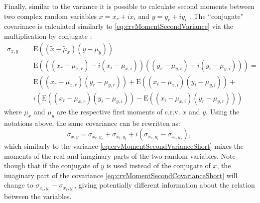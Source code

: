 \documentclass[
]{book}
\begin{document}
Finally, similar to the variance it is possible to calculate second moments between two complex random variables \(x = x_r+i x_i\) and \(y = y_r + i y_i\) \citep{Picinbono1997}. The ``conjugate'' covariance is calculated similarly to \eqref{eq:crvMomentSecondVariance} via the multiplication by conjugate \citep{Neeser1993}:
\begin{equation}
    \begin{aligned}
    \sigma_{x,y} = & \mathrm{E}((\tilde{x}-\tilde{\mu}_x) (y-\mu_y)) = \\
                   & \mathrm{E}\left(((x_r-\mu_{x,r}) - i (x_i-\mu_{x,i}))((y_r-\mu_{y,r}) + i (y_i-\mu_{y,i}))\right) = \\
                   & \mathrm{E}((x_r-\mu_{x,r})(y_r-\mu_{y,r})) + \mathrm{E}((x_i-\mu_{x,i})(y_i-\mu_{y,i})) + \\
                   & i \left(\mathrm{E}((x_r-\mu_{x,r})(y_i-\mu_{y,i})) - \mathrm{E}((x_i-\mu_{x,i})(y_r-\mu_{y,r}))\right)
    \end{aligned}
    \label{eq:crvMomentSecondCovariance}
\end{equation}
where \(\mu_{x}\) and \(\mu_y\) are the respective first moments of c.r.v. \(x\) and \(y\). Using the notations above, the same covariance can be rewritten as:
\begin{equation}
    \sigma_{x,y} = \sigma_{x_r, y_r} + \sigma_{x_i, y_i} + i (\sigma_{x_r, y_i} - \sigma_{x_i, y_r}),
    \label{eq:crvMomentSecondCovarianceShort}
\end{equation}
which similarly to the variance \eqref{eq:crvMomentSecondVarianceShort} mixes the moments of the real and imaginary parts of the two random variables. Note though that if the conjugate of \(y\) is used instead of the conjugate of \(x\), the imaginary part of the covariance \eqref{eq:crvMomentSecondCovarianceShort} will change to \(\sigma_{x_i, y_r} - \sigma_{x_r, y_i}\), giving potentially different information about the relation between the variables.
\end{document}
